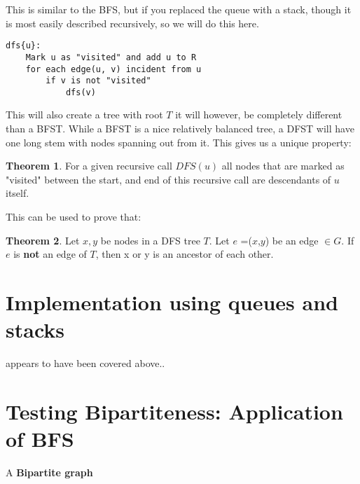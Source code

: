 \documentclass{report}
\theoremstyle{definition}
\newtheorem*{theo}{Theorem}
\begin{document}
				 This is similar to the BFS, but if you replaced the queue with a stack, though it is most easily 
				described recursively, so we will do this here.
\begin{lstlisting}
dfs{u}:
	Mark u as "visited" and add u to R
	for each edge(u, v) incident from u
		if v is not "visited"
			dfs(v)
\end{lstlisting}
				This will also create a tree with root $T$ it will however, be completely different than a BFST. While a BFST
				is a nice relatively balanced tree, a DFST will have one long stem with nodes spanning out from it. This gives
				us a unique property:
				\begin{theo}
					For a given recursive call $DFS(u)$ all nodes that are marked as "visited" between the start, and end
					of this recursive call are descendants of $u$ itself.
				\end{theo}
				This can be used to prove that:
				\begin{theo}
					Let $x, y$ be nodes in a DFS tree $T$. Let $e$ =($x$,$y$) be an edge $\in G$. If $e$ is \textbf{not}
					an edge of $T$, then x or y is an ancestor of each other.
				\end{theo}
	\section{Implementation using queues and stacks}
		appears to have been covered above..
	\section{Testing Bipartiteness: Application of BFS}
		A \textbf{Bipartite graph}
\end{document}
